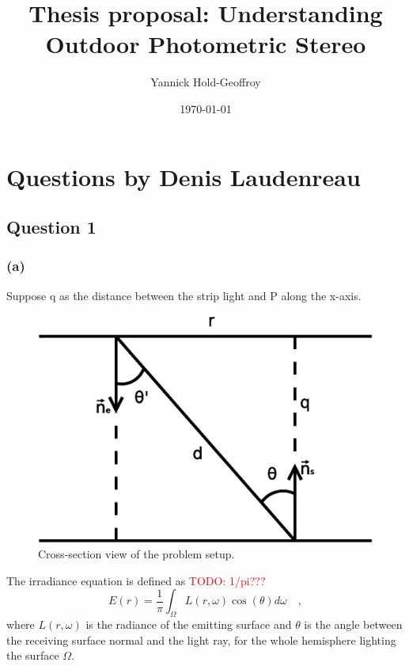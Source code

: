 \documentclass{report}
\title{Thesis proposal: Understanding Outdoor Photometric Stereo}
\author{Yannick Hold-Geoffroy}
\date{\today}
\begin{document}

\maketitle

\tableofcontents

\hypersetup{colorlinks=true,linkcolor=blue}

\newcommand*\B[1]{\mathbf{#1}}
\newcommand{\boldomega}{\boldsymbol \omega} %
\newcommand{\boldmu}{\boldsymbol \mu} %
\newcommand{\bolddelta}{\boldsymbol \delta} %

\newcommand\norm[1]{\left\lVert#1\right\rVert}

\newcommand\todo[1]{\textcolor{red}{TODO: #1}}

\graphicspath{{figures/}}

\chapter{Questions by Denis Laudenreau}

\section{Question 1}

\subsection{(a)}

Suppose q as the distance between the strip light and P along the x-axis.

\begin{figure}
  \centering
  \includegraphics[width=0.45\linewidth]{q1a_setup.eps}
  \caption[Problem setup]
   {Cross-section view of the problem setup.}
  \label{q1a:setup}
\end{figure}

The irradiance equation is defined as \todo{1/pi???}
\begin{equation}
E(r) = \frac{1}{\pi} \int_{\Omega} L(r,\omega)\cos(\theta) d\omega
\quad,
\end{equation}
where $L(r,\omega)$ is the radiance of the emitting surface and $\theta$ is the angle between the receiving surface normal and the light ray, for the whole hemisphere lighting the surface $\Omega$.
\end{document}
